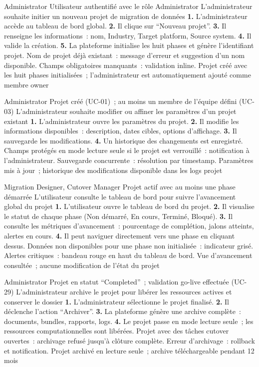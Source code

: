  {Administrator}
  {Utilisateur authentifié avec le rôle Administrator}
  {L'administrateur souhaite initier un nouveau projet de migration de données}
  {\textbf{1.} L'administrateur accède au tableau de bord global. \textbf{2.} Il clique sur ``Nouveau projet''. \textbf{3.} Il renseigne les informations~: nom, Industry, Target platform, Source system. \textbf{4.} Il valide la création. \textbf{5.} La plateforme initialise les huit phases et génère l'identifiant projet.}
  {Nom de projet déjà existant~: message d'erreur et suggestion d'un nom disponible. Champs obligatoires manquants~: validation inline.}
  {Projet créé avec les huit phases initialisées~; l'administrateur est automatiquement ajouté comme membre owner}

  {Administrator}
  {Projet créé (UC-01)~; au moins un membre de l'équipe défini (UC-03)}
  {L'administrateur souhaite modifier ou affiner les paramètres d'un projet existant}
  {\textbf{1.} L'administrateur ouvre les paramètres du projet. \textbf{2.} Il modifie les informations disponibles~: description, dates cibles, options d'affichage. \textbf{3.} Il sauvegarde les modifications. \textbf{4.} Un historique des changements est enregistré.}
  {Champs protégés en mode lecture seule si le projet est verrouillé~: notification à l'administrateur. Sauvegarde concurrente~: résolution par timestamp.}
  {Paramètres mis à jour~; historique des modifications disponible dans les logs projet}

  {Migration Designer, Cutover Manager}
  {Projet actif avec au moins une phase démarrée}
  {L'utilisateur consulte le tableau de bord pour suivre l'avancement global du projet}
  {\textbf{1.} L'utilisateur ouvre le tableau de bord du projet. \textbf{2.} Il visualise le statut de chaque phase (Non démarré, En cours, Terminé, Bloqué). \textbf{3.} Il consulte les métriques d'avancement~: pourcentage de complétion, jalons atteints, alertes en cours. \textbf{4.} Il peut naviguer directement vers une phase en cliquant dessus.}
  {Données non disponibles pour une phase non initialisée~: indicateur grisé. Alertes critiques~: bandeau rouge en haut du tableau de bord.}
  {Vue d'avancement consultée~; aucune modification de l'état du projet}

  {Administrator}
  {Projet en statut ``Completed''~; validation go-live effectuée (UC-29)}
  {L'administrateur archive le projet pour libérer les ressources actives et conserver le dossier}
  {\textbf{1.} L'administrateur sélectionne le projet finalisé. \textbf{2.} Il déclenche l'action ``Archiver''. \textbf{3.} La plateforme génère une archive complète~: documents, bundles, rapports, logs. \textbf{4.} Le projet passe en mode lecture seule~; les ressources computationnelles sont libérées.}
  {Projet avec des tâches cutover ouvertes~: archivage refusé jusqu'à clôture complète. Erreur d'archivage~: rollback et notification.}
  {Projet archivé en lecture seule~; archive téléchargeable pendant 12 mois}

